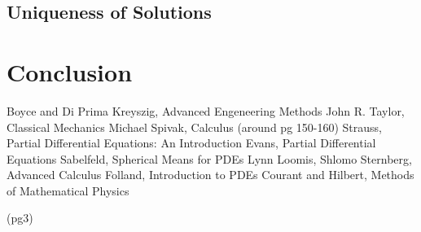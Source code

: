 \documentclass[a4paper, 12pt]{article}
\numberwithin{equation}{section}
\begin{document}
\subsection{Uniqueness of Solutions}

\section{Conclusion}

\begin{thebibliography}{99}
 Boyce and Di Prima 
 Kreyszig, Advanced Engeneering Methods
 John R. Taylor, Classical Mechanics
 Michael Spivak, Calculus (around pg 150-160)
 Strauss, Partial Differential Equations: An Introduction
 Evans, Partial Differential Equations
 Sabelfeld, Spherical Means for PDEs
 Lynn Loomis, Shlomo Sternberg, Advanced Calculus
 Folland, Introduction to PDEs
 Courant and Hilbert, Methods of Mathematical Physics
\end{thebibliography} (pg3)
\end{document}
